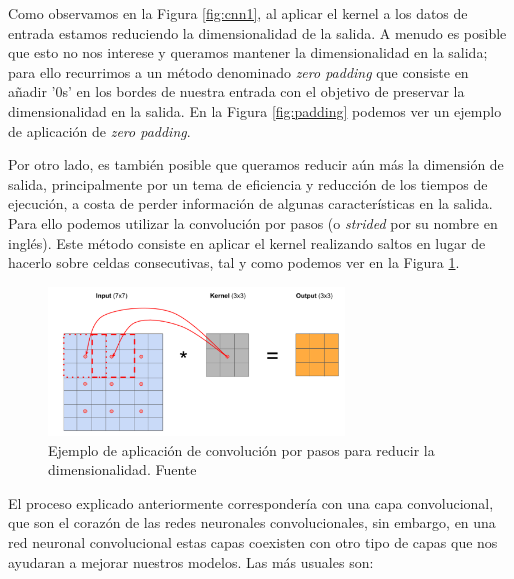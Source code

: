 Como observamos en la Figura \ref{fig:cnn1}, al aplicar el kernel a los datos de  entrada estamos reduciendo la dimensionalidad de la salida. A menudo es posible que esto no nos interese y queramos mantener la dimensionalidad en la salida; para ello recurrimos a un método denominado \textit{zero padding} que consiste en añadir '0s' en los bordes de nuestra entrada con el objetivo de preservar la dimensionalidad en la salida. En la Figura \ref{fig:padding} podemos ver un ejemplo de aplicación de \textit{zero padding}.




Por otro lado, es también posible que queramos reducir aún más la dimensión de salida, principalmente por un tema de eficiencia y reducción de los tiempos de ejecución, a costa de perder información de algunas características en la salida. Para ello podemos utilizar la convolución por pasos (o \textit{strided} por su nombre en inglés). Este método consiste en aplicar el kernel realizando saltos en lugar de hacerlo sobre celdas consecutivas,  tal y como podemos ver en la Figura \ref{fig:strided}.

\begin{figure}[!ht]
	\centering
	\includegraphics[width=0.7\textwidth]{images/arte/strided}
	\caption{Ejemplo de aplicación de convolución por pasos para reducir la dimensionalidad. Fuente \cite{temariodeeplearning}}
	\label{fig:strided}
\end{figure}



El proceso explicado anteriormente correspondería con una capa convolucional, que son el corazón de las redes neuronales convolucionales, sin embargo, en una red neuronal convolucional estas capas coexisten con otro tipo de capas que nos ayudaran a mejorar nuestros modelos. Las más usuales son:

